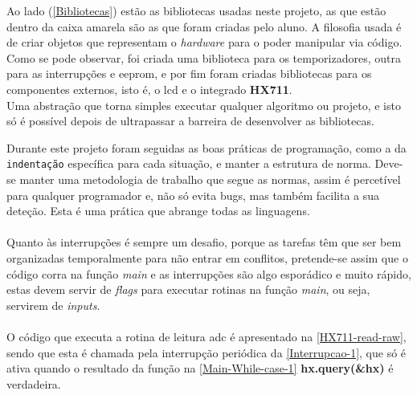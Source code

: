 \hspace{2pt}
\begin{minipage}{.6\linewidth}
	Ao lado (\autoref{Bibliotecas}) estão as bibliotecas usadas neste projeto, as que estão dentro da caixa amarela são as que foram criadas pelo aluno.
	A filosofia usada é de criar objetos que representam o \textit{hardware} para o poder manipular via código. Como se pode observar, foi criada uma biblioteca para os temporizadores, outra para as interrupções e \ac{eeprom}, e por fim foram criadas bibliotecas para os componentes externos, isto é, o \acs{lcd} e o integrado \textbf{HX711}.
	\\
	Uma abstração que torna simples executar qualquer algoritmo ou projeto, e isto só é possível depois de ultrapassar a barreira de desenvolver as bibliotecas.
\end{minipage}
Durante este projeto foram seguidas as boas práticas de programação, como a da \texttt{indentação} específica para cada situação, e manter a estrutura de norma. Deve-se manter uma metodologia de trabalho que segue as normas, assim é percetível para qualquer programador e, não só evita bugs, mas também facilita a sua deteção. Esta é uma prática que abrange todas as linguagens.
\\
\\
Quanto às interrupções é sempre um desafio, porque as tarefas têm que ser bem organizadas temporalmente para não entrar em conflitos, pretende-se assim que o código corra na função \textit{main} e as interrupções são algo esporádico e muito rápido, estas devem servir de \textit{flags} para executar rotinas na função \textit{main}, ou seja, servirem de \textit{inputs}. %
\\
\\
O código que executa a rotina de leitura \acs{adc} é apresentado na \autoref{HX711-read-raw}, sendo que esta é chamada pela interrupção periódica da \autoref{Interrupcao-1}, que só é ativa quando o resultado da função na \autoref{Main-While-case-1} \textbf{hx.query(\&hx)} é verdadeira.
{
	
}
{
	
}
